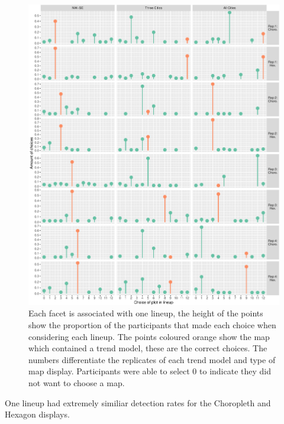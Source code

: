 \documentclass[conference,final,]{IEEEtran}
\makeatletter
\def\maxwidth{\ifdim\Gin@nat@width>\linewidth\linewidth
\else\Gin@nat@width\fi}
\let\Oldincludegraphics\includegraphics
\renewcommand{\includegraphics}[1]{\Oldincludegraphics[width=\maxwidth]{#1}}
\makeatother
\begin{document}
\begin{figure}
\centering
\includegraphics{paper_files/figure-latex/choices-1.pdf}
\caption{Each facet is associated with one lineup, the height of the
points show the proportion of the participants that made each choice
when considering each lineup. The points coloured orange show the map
which contained a trend model, these are the correct choices. The
numbers differentiate the replicates of each trend model and type of map
display. Participants were able to select 0 to indicate they did not
want to choose a map.}
\end{figure}

One lineup had extremely similiar detection rates for the Choropleth and
Hexagon displays.
\end{document}
